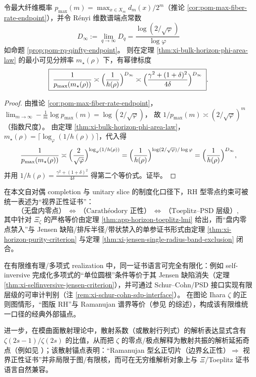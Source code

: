 \begin{corollary}\label{cor:xi-bulk-horizon-defect-visibility-Dinfty}
令最大纤维概率 \(p_{\max}(m)=\max_{x\in X_m}d_m(x)/2^m\)（推论 \ref{cor:pom-max-fiber-rate-endpoint}），并令 Rényi 维数谱端点常数
\[
D_\infty:=\lim_{q\to\infty}D_q=\frac{\log(2/\sqrt{\varphi})}{\log\varphi}
\]
如命题 \ref{prop:pom-rq-qinfty-endpoint}。
则在定理 \ref{thm:xi-bulk-horizon-phi-area-law} 的最小可见分辨率 \(m_\star(\rho)\) 下，有幂律标度
\[
\boxed{\;
\frac{1}{p_{\max}(m_\star(\rho))}
\asymp
\Bigl(\frac{1}{h(\rho)}\Bigr)^{D_\infty}
\asymp
\Bigl(\frac{\gamma^2+(1+\delta)^2}{4\delta}\Bigr)^{D_\infty}\; }.
\]
\end{corollary}
\begin{proof}
由推论 \ref{cor:pom-max-fiber-rate-endpoint}，
\(
\lim_{m\to\infty}-\frac{1}{m}\log p_{\max}(m)=\log(2/\sqrt{\varphi})
\)，
故 \(1/p_{\max}(m)\asymp (2/\sqrt{\varphi})^{m}\)（指数尺度）。
由定理 \ref{thm:xi-bulk-horizon-phi-area-law}，\(m_\star(\rho)=\lceil \log_\varphi(1/h(\rho))\rceil\)，代入得
\[
\frac{1}{p_{\max}(m_\star(\rho))}
\asymp
\Bigl(\frac{2}{\sqrt{\varphi}}\Bigr)^{\log_{\varphi}(1/h(\rho))}
=\Bigl(\frac{1}{h(\rho)}\Bigr)^{\log(2/\sqrt{\varphi})/\log\varphi}
=\Bigl(\frac{1}{h(\rho)}\Bigr)^{D_\infty},
\]
并用 \(1/h(\rho)=\frac{\gamma^2+(1+\delta)^2}{4\delta}\) 得第二个等价式。证毕。
\end{proof}

\begin{proposition}\label{prop:xi-ramanujan-horizon-toeplitz-transfer}
在本文自对偶 completion 与 unitary slice 的制度化口径下，RH 型零点约束可被统一表述为“视界正性证书”：
\[
\text{（无盘内零点）}
\ \Longleftrightarrow\
\text{（Carath\'eodory 正性）}
\ \Longleftrightarrow\
\text{（Toeplitz--PSD 层级）},
\]
其中针对 \(\Xi_{\zeta}\) 的严格等价由定理 \ref{thm:app-horizon-toeplitz-lmi} 给出，而“盘内零点禁入”与 Jensen 缺陷/排斥半径/带状禁入的单参证书形式由定理 \ref{thm:xi-horizon-purity-criterion} 与定理 \ref{thm:xi-jensen-single-radius-band-exclusion} 闭合。
\par
在有限维有理/多项式 realization 中，同一证书语言可完全有限化：例如 self-inversive 完成化多项式的“单位圆根”条件等价于其 Jensen 缺陷消失（定理 \ref{thm:xi-selfinversive-jensen-criterion}），并可通过 Schur--Cohn/PSD 接口实现有限层级的可审计判别（注 \ref{rem:xi-schur-cohn-sdp-interface}）。
在图论 Ihara \(\zeta\) 的正则图情形，“图版 RH”与 Ramanujan 谱界等价（参见 \cite{TerrasZetaGraphs,StarkTerras1996GraphCoverings} 的综述），构成该有限维统一口径的经典外部锚点。
\par
进一步，在模曲面散射理论中，散射系数（或散射行列式）的解析表达显式含有 \(\zeta(2s-1)/\zeta(2s)\) 的比值，从而把 \(\zeta\) 的零点/极点解释为散射共振的解析延拓奇点（例如见 \cite{Iwaniec2002SpectralMethods}）；该散射锚点表明：“Ramanujan 型幺正切片（边界幺正性）\(\Rightarrow\) 视界正性证书”并非局限于图/有限核，而可在无穷维解析对象上与 \(\Xi\)/Toeplitz 证书语言自然兼容。
\end{proposition}

